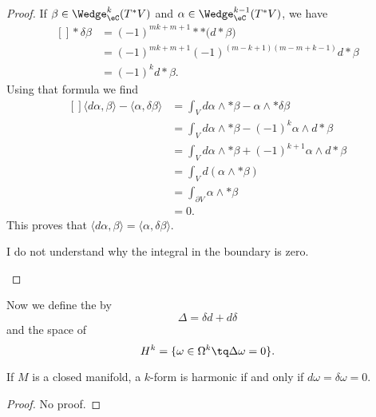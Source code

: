 \begin{proof}
	If $\beta\in\Wedge_{\eC}^k(T^*V)$ and $\alpha\in\Wedge_{\eC}^{k-1}(T^*V)$, we have
	\begin{equation}
		\begin{aligned}[]
			*\delta\beta&=(-1)^{mk+m+1}* *\big( d*\beta \big)\\
			&=(-1)^{mk+m+1}(-1)^{(m-k+1)(m-m+k-1)}d*\beta\\
			&=(-1)^kd*\beta.
		\end{aligned}
	\end{equation}
	Using that formula we find
	\begin{equation}
		\begin{aligned}[]
			\langle d\alpha, \beta\rangle -\langle \alpha, \delta\beta\rangle &=\int_V d\alpha\wedge *\beta-\alpha\wedge *\delta\beta\\
			&=\int_Vd\alpha\wedge *\beta-(-1)^k\alpha\wedge d*\beta\\
			&=\int_Vd\alpha\wedge *\beta+(-1)^{k+1}\alpha\wedge d*\beta\\
			&=\int_Vd(\alpha\wedge *\beta)\\
			&=\int_{\partial V}\alpha\wedge *\beta\\
			&=0.
		\end{aligned}
	\end{equation}
	This proves that $\langle d\alpha, \beta\rangle =\langle \alpha, \delta\beta\rangle$.
	\begin{probleme}
		I do not understand why the integral in the boundary is zero.
	\end{probleme}
\end{proof}

Now we define the  by
\begin{equation}
	\Delta=\delta d+d\delta
\end{equation}
and the space of 
\begin{equation}
	H^k=\{ \omega\in\Omega^k\tq\Delta\omega=0 \}.
\end{equation}

\begin{lemma}
	If $M$ is a closed manifold, a $k$-form is harmonic if and only if $d\omega=\delta\omega=0$.
\end{lemma}

\begin{proof}
	No proof.
\end{proof}

